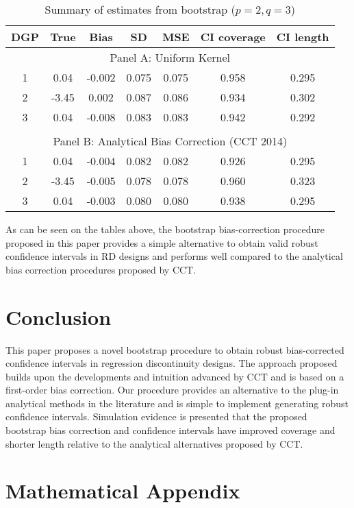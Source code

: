 \documentclass[12pt,fleqn]{article}
\begin{document}
\begin{table}[ht]\label{Tb2}
	\caption{Summary of estimates from bootstrap ($p = 2, q = 3$)}
	\centering
	\begin{tabular}{ccccccc}
		\hline
		DGP & True & Bias & SD & MSE & CI coverage & CI length \\ 
		\hline
		\multicolumn{7}{c}{Panel A: Uniform Kernel} \\
		1 & 0.04 & -0.002 & 0.075 & 0.075 & 0.958 & 0.295 \\ 
		2 & -3.45 & 0.002 & 0.087 & 0.086 & 0.934 & 0.302 \\ 
		3 & 0.04 & -0.008 & 0.083 & 0.083 & 0.942 & 0.292 \\ 
		&&&&&& \\
		\multicolumn{7}{c}{Panel B: Analytical Bias Correction (CCT 2014)} \\
		1 & 0.04 & -0.004 & 0.082 & 0.082 & 0.926 & 0.295 \\ 		
		2 & -3.45 & -0.005 & 0.078 & 0.078 & 0.960 & 0.323 \\ 		
		3 & 0.04 & -0.003 & 0.080 & 0.080 & 0.938 & 0.295 \\ 
		\hline
	\end{tabular}
\end{table}
As can be seen on the tables above, the bootstrap bias-correction procedure
proposed in this paper provides a simple alternative to obtain valid robust
confidence intervals in RD designs and performs well compared to the analytical 
bias correction procedures proposed by CCT.


\section{Conclusion}\label{conclusion}
This paper proposes a novel bootstrap procedure to obtain robust bias-corrected
confidence intervals in regression discontinuity designs. 
The approach proposed builds upon the developments and intuition advanced by CCT and is based on a first-order bias correction.
Our procedure provides an alternative to the plug-in analytical methods in the literature and is simple to implement generating robust confidence intervals.
Simulation evidence is presented that the proposed bootstrap bias correction and confidence intervals have improved coverage and shorter length relative to the analytical alternatives proposed by CCT.

\appendix
\section{Mathematical Appendix}
\end{document}
